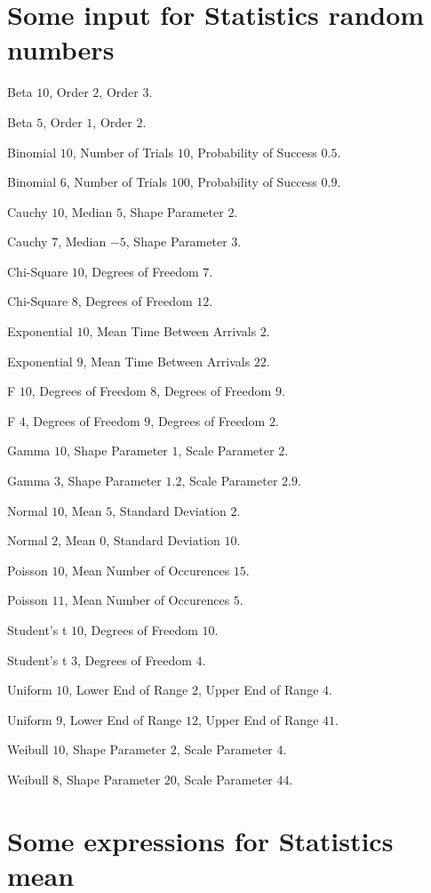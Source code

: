 \documentclass{article}
\begin{document}
\section{Some input for Statistics random numbers}

Beta $10$, Order $2$, Order $3$.

Beta $5$, Order $1$, Order $2$.

Binomial $10$, Number of Trials $10$, Probability of Success $0.5$.

Binomial $6$, Number of Trials $100$, Probability of Success $0.9$.

Cauchy $10$, Median $5$, Shape Parameter $2$.

Cauchy $7$, Median $-5$, Shape Parameter $3$.

Chi-Square $10$, Degrees of Freedom $7$.

Chi-Square $8$, Degrees of Freedom $12$.

Exponential $10$, Mean Time Between Arrivals $2$.

Exponential $9$, Mean Time Between Arrivals $22$.

F $10$, Degrees of Freedom $8$, Degrees of Freedom $9$.

F $4$, Degrees of Freedom $9$, Degrees of Freedom $2$.

Gamma $10$, Shape Parameter $1$, Scale Parameter $2$.

Gamma $3$, Shape Parameter $1.2$, Scale Parameter $2.9$.

Normal $10$, Mean $5$, Standard Deviation $2$.

Normal $2$, Mean $0$, Standard Deviation $10$.

Poisson $10$, Mean Number of Occurences $15$.

Poisson $11$, Mean Number of Occurences $5$.

Student's t $10$, Degrees of Freedom $10$.

Student's t $3$, Degrees of Freedom $4$.

Uniform $10$, Lower End of Range $2$, Upper End of Range $4$.

Uniform $9$, Lower End of Range $12$, Upper End of Range $41$.

Weibull $10$, Shape Parameter $2$, Scale Parameter $4$.

Weibull $8$, Shape Parameter $20$, Scale Parameter $44$.

\section{Some expressions for Statistics mean}
\end{document}
